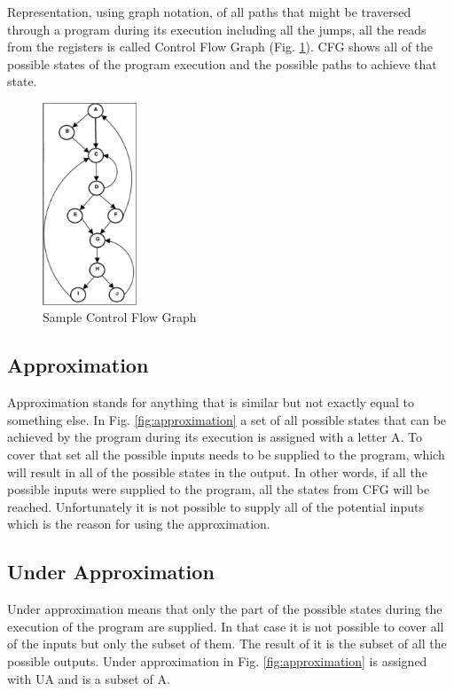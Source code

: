 \documentclass[a4paper, 12pt, journal, onecolumn]{IEEEtran}
\begin{document}
Representation, using graph notation, of all paths that might be traversed through a program during its execution including all the jumps, all the reads from the registers is called Control Flow Graph (Fig. \ref{fig:CFG}). CFG shows all of the possible states of the program execution and the possible paths to achieve that state.


\begin{figure}[ht]
    \centering
    \captionsetup{justification=centering}
    \includegraphics[width=0.25\textwidth]{CFG.png}
    \caption{Sample Control Flow Graph \cite{a3} }
    \label{fig:CFG}
\end{figure}


\subsection{Approximation}

Approximation stands for anything that is similar but not exactly equal to something else. In Fig. \ref{fig:approximation} a set of all possible states that can be achieved by the program during its execution is assigned with a letter A. To cover that set all the possible inputs needs to be supplied to the program, which will result in all of the possible states in the output. In other words, if all the possible inputs were supplied to the program, all the states from CFG will be reached. Unfortunately it is not possible to supply all of the potential inputs which is the reason for using the approximation. 

\subsection{Under Approximation}

Under approximation means that only the part of the possible states during the execution of the program are supplied. In that case it is not possible to cover all of the inputs but only the subset of them. The result of it is the subset of all the possible outputs. Under approximation in Fig. \ref{fig:approximation} is assigned with UA and is a subset of A. \cite{a4}
\end{document}
